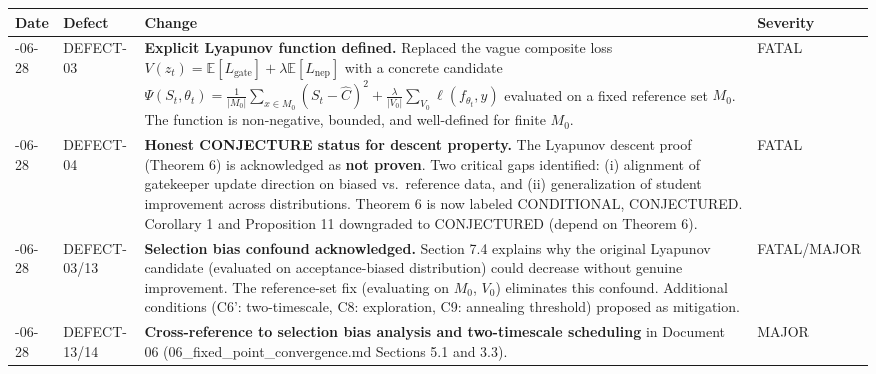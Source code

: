 \documentclass[
  12pt,
]{ctexart}
\begin{document}
\begin{longtable}[]{@{}
  >{\raggedright\arraybackslash}p{}
  >{\raggedright\arraybackslash}p{}
  >{\raggedright\arraybackslash}p{}
  >{\raggedright\arraybackslash}p{}@{}}
\toprule\noalign{}
\begin{minipage}[b]{\linewidth}\raggedright
Date
\end{minipage} & \begin{minipage}[b]{\linewidth}\raggedright
Defect
\end{minipage} & \begin{minipage}[b]{\linewidth}\raggedright
Change
\end{minipage} & \begin{minipage}[b]{\linewidth}\raggedright
Severity
\end{minipage} \\
\midrule\noalign{}
\endhead
\bottomrule\noalign{}
\endlastfoot
2026-06-28 & DEFECT-03 & \textbf{Explicit Lyapunov function defined.}
Replaced the vague composite loss
\(V(z_t) = \mathbb{E}[L_{\text{gate}}] + \lambda \mathbb{E}[L_{\text{nep}}]\)
with a concrete candidate
\(\Psi(S_t, \theta_t) = \frac{1}{|M_0|}\sum_{x \in M_0}(S_t - \hat{C})^2 + \frac{\lambda}{|V_0|}\sum_{V_0}\ell(f_{\theta_t}, y)\)
evaluated on a fixed reference set \(M_0\). The function is
non-negative, bounded, and well-defined for finite \(M_0\). & FATAL \\
2026-06-28 & DEFECT-04 & \textbf{Honest CONJECTURE status for descent
property.} The Lyapunov descent proof (Theorem 6) is acknowledged as
\textbf{not proven}. Two critical gaps identified: (i) alignment of
gatekeeper update direction on biased vs.~reference data, and (ii)
generalization of student improvement across distributions. Theorem 6 is
now labeled CONDITIONAL, CONJECTURED. Corollary 1 and Proposition 11
downgraded to CONJECTURED (depend on Theorem 6). & FATAL \\
2026-06-28 & DEFECT-03/13 & \textbf{Selection bias confound
acknowledged.} Section 7.4 explains why the original Lyapunov candidate
(evaluated on acceptance-biased distribution) could decrease without
genuine improvement. The reference-set fix (evaluating on \(M_0\),
\(V_0\)) eliminates this confound. Additional conditions (C6':
two-timescale, C8: exploration, C9: annealing threshold) proposed as
mitigation. & FATAL/MAJOR \\
2026-06-28 & DEFECT-13/14 & \textbf{Cross-reference to selection bias
analysis and two-timescale scheduling} in Document 06
(06\_fixed\_point\_convergence.md Sections 5.1 and 3.3). & MAJOR \\
\end{longtable}
\end{document}
